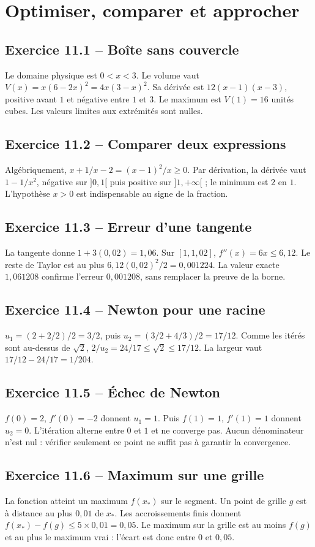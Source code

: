 \chapter{Optimiser, comparer et approcher}
\section*{Exercice 11.1 -- Boîte sans couvercle}
Le domaine physique est $0<x<3$. Le volume vaut $V(x)=x(6-2x)^2=4x(3-x)^2$. Sa dérivée est $12(x-1)(x-3)$, positive avant $1$ et négative entre $1$ et $3$. Le maximum est $V(1)=16$ unités cubes. Les valeurs limites aux extrémités sont nulles.

\section*{Exercice 11.2 -- Comparer deux expressions}
Algébriquement, $x+1/x-2=(x-1)^2/x\ge0$. Par dérivation, la dérivée vaut $1-1/x^2$, négative sur $]0,1[$ puis positive sur $]1,+\infty[$ ; le minimum est $2$ en $1$. L'hypothèse $x>0$ est indispensable au signe de la fraction.

\section*{Exercice 11.3 -- Erreur d'une tangente}
La tangente donne $1+3(0{,}02)=1{,}06$. Sur $[1,1{,}02]$, $f''(x)=6x\le6{,}12$. Le reste de Taylor est au plus $6{,}12(0{,}02)^2/2=0{,}001224$. La valeur exacte $1{,}061208$ confirme l'erreur $0{,}001208$, sans remplacer la preuve de la borne.

\section*{Exercice 11.4 -- Newton pour une racine}
$u_1=(2+2/2)/2=3/2$, puis $u_2=(3/2+4/3)/2=17/12$. Comme les itérés sont au-dessus de $\sqrt2$, $2/u_2=24/17\le\sqrt2\le17/12$. La largeur vaut $17/12-24/17=1/204$.

\section*{Exercice 11.5 -- Échec de Newton}
$f(0)=2$, $f'(0)=-2$ donnent $u_1=1$. Puis $f(1)=1$, $f'(1)=1$ donnent $u_2=0$. L'itération alterne entre $0$ et $1$ et ne converge pas. Aucun dénominateur n'est nul : vérifier seulement ce point ne suffit pas à garantir la convergence.

\section*{Exercice 11.6 -- Maximum sur une grille}
La fonction atteint un maximum $f(x_*)$ sur le segment. Un point de grille $g$ est à distance au plus $0{,}01$ de $x_*$. Les accroissements finis donnent $f(x_*)-f(g)\le5\times0{,}01=0{,}05$. Le maximum sur la grille est au moins $f(g)$ et au plus le maximum vrai : l'écart est donc entre $0$ et $0{,}05$.
